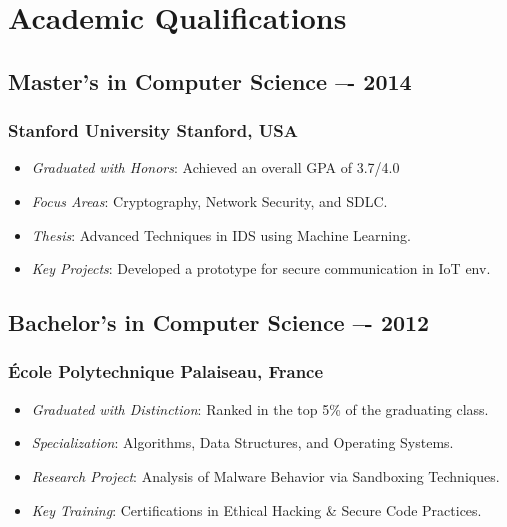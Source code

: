 
\section{Academic Qualifications}

\subsection{Master's in Computer Science \texorpdfstring{\hspace*{\fill}}{\hspace*{\fill}}  –- 2014}
\subsubsection{Stanford University \texorpdfstring{\hspace*{\fill}}{\hspace*{\fill}} \normalfont Stanford, USA}

\begin{itemize}
    \item[\checkmark] \textit{Graduated with Honors}: Achieved an overall GPA of 3.7/4.0
    \item[\checkmark] \textit{Focus Areas}: Cryptography, Network Security, and SDLC.
    \item[\checkmark] \textit{Thesis}: Advanced Techniques in IDS using Machine Learning.
    \item[\checkmark] \textit{Key Projects}: Developed a prototype for secure communication in IoT env.
\end{itemize}

\subsection{Bachelor's in Computer Science \texorpdfstring{\hspace*{\fill}}{\hspace*{\fill}}  –- 2012}
\subsubsection{École Polytechnique \texorpdfstring{\hspace*{\fill}}{\hspace*{\fill}} \normalfont Palaiseau, France}

\begin{itemize}
    \item[\checkmark] \textit{Graduated with Distinction}: Ranked in the top 5\% of the graduating class.
    \item[\checkmark] \textit{Specialization}: Algorithms, Data Structures, and Operating Systems.
    \item[\checkmark] \textit{Research Project}: Analysis of Malware Behavior via Sandboxing Techniques.
    \item[\checkmark] \textit{Key Training}: Certifications in Ethical Hacking \& Secure Code Practices.
\end{itemize}
